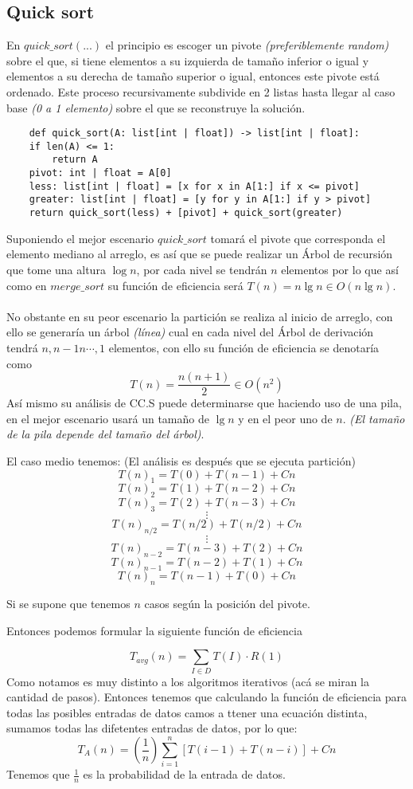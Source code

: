 \documentclass[tikz,11pt,fleqn]{book} %
\begin{document}
\subsection{Quick sort}
En $quick\_sort(...)$ el principio es escoger un pivote \textit{(preferiblemente random)} sobre el que, si tiene elementos a su izquierda de tamaño inferior o igual y elementos a su derecha de tamaño superior o igual, entonces este pivote está ordenado. Este proceso recursivamente subdivide en 2 listas hasta llegar al caso base \textit{(0 a 1 elemento)} sobre el que se reconstruye la solución. 
\begin{lstlisting}
    def quick_sort(A: list[int | float]) -> list[int | float]:
    if len(A) <= 1:
        return A
    pivot: int | float = A[0]
    less: list[int | float] = [x for x in A[1:] if x <= pivot]
    greater: list[int | float] = [y for y in A[1:] if y > pivot]
    return quick_sort(less) + [pivot] + quick_sort(greater)
\end{lstlisting}
Suponiendo el mejor escenario $quick\_sort$ tomará el pivote que corresponda el elemento mediano al arreglo, es así que se puede realizar un Árbol de recursión que tome una altura $\log n$, por cada nivel se tendrán $n$ elementos por lo que así como en $merge\_sort$ su función de eficiencia será $T(n)=n\lg n\in O(n\lg n)$.
\\\\
No obstante en su peor escenario la partición se realiza al inicio de arreglo, con ello se generaría un árbol \textit{(línea)} cual en cada nivel del Árbol de derivación tendrá $n,n-1n\cdots,1$ elementos, con ello su función de eficiencia se denotaría como
$$T(n)=\frac{n(n+1)}2\in O(n^2)$$
Así mismo su análisis de CC.S puede determinarse que haciendo uso de una pila, en el mejor escenario usará un tamaño de $\lg n$ y en el peor uno de $n$. \textit{(El tamaño de la pila depende del tamaño del árbol)}.

El caso medio tenemos:
(El análisis es después que se ejecuta partición)
$$
T(n)_1=T(0)+T(n-1)+Cn
$$ $$
T(n)_2=T(1)+T(n-2)+Cn
$$ $$
T(n)_3=T(2)+T(n-3)+Cn
$$ $$ \vdots $$ $$
T(n)_{n/2}=T(n/2)+T(n/2)+Cn
$$ $$ \vdots $$ $$
T(n)_{n-2}=T(n-3)+T(2)+Cn
$$ $$
T(n)_{n-1}=T(n-2)+T(1)+Cn
$$ $$
T(n)_n=T(n-1)+T(0)+Cn
$$

Si se supone que tenemos $n$ casos según la posición del pivote.

Entonces podemos formular la siguiente función de eficiencia

$$
T_{avg}(n)=\sum_{I\in D}T(I)\cdot R(1)
$$
Como notamos es muy distinto a los algoritmos iterativos (acá se miran la cantidad de pasos). Entonces tenemos que calculando la función de eficiencia para todas las posibles entradas de datos camos a ttener una ecuación distinta, sumamos todas las difetentes entradas de datos, por lo que:
$$
T_A(n)
=(\frac1n)\sum_{i=1}^n[T(i-1)+T(n-i)]+Cn
$$
Tenemos que $\frac1n$ es la probabilidad de la entrada de datos.
\end{document}
